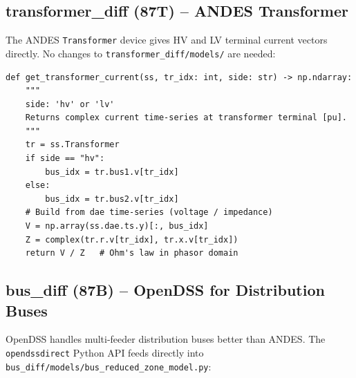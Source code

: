 \documentclass[11pt,a4paper]{article}
\begin{document}
\subsection{transformer\_diff (87T) -- ANDES Transformer}

The ANDES \texttt{Transformer} device gives HV and LV terminal current
vectors directly. No changes to \texttt{transformer\_diff/models/} are
needed:

\begin{lstlisting}[style=python, caption={Extract transformer terminal currents}]
def get_transformer_current(ss, tr_idx: int, side: str) -> np.ndarray:
    """
    side: 'hv' or 'lv'
    Returns complex current time-series at transformer terminal [pu].
    """
    tr = ss.Transformer
    if side == "hv":
        bus_idx = tr.bus1.v[tr_idx]
    else:
        bus_idx = tr.bus2.v[tr_idx]
    # Build from dae time-series (voltage / impedance)
    V = np.array(ss.dae.ts.y)[:, bus_idx]
    Z = complex(tr.r.v[tr_idx], tr.x.v[tr_idx])
    return V / Z   # Ohm's law in phasor domain
\end{lstlisting}

\subsection{bus\_diff (87B) -- OpenDSS for Distribution Buses}

OpenDSS handles multi-feeder distribution buses better than ANDES.
The \texttt{opendssdirect} Python API feeds directly into
\texttt{bus\_diff/models/bus\_reduced\_zone\_model.py}:
\end{document}
